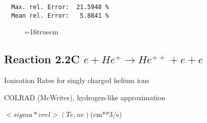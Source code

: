 \documentclass[12pt]{article}
\begin{document}
\begin{small}
\begin{verbatim}
  Max. rel. Error:  21.5948 %
  Mean rel. Error:   5.8841 %

\end{verbatim}\end{small}
\begin{figure} \label{2.3.13d}
\epsfxsize=16truecm
\end{figure}
\newpage



\subsection{
Reaction 2.2C $e + He^+ \rightarrow He^{++}  + e  + e $
}
  Ionisation Rates for singly charged helium ions

  COLRAD (McWriter), hydrogen-like approximation

$ <sigma*vrel>(Te,ne) $(cm**3/s)
\end{document}
